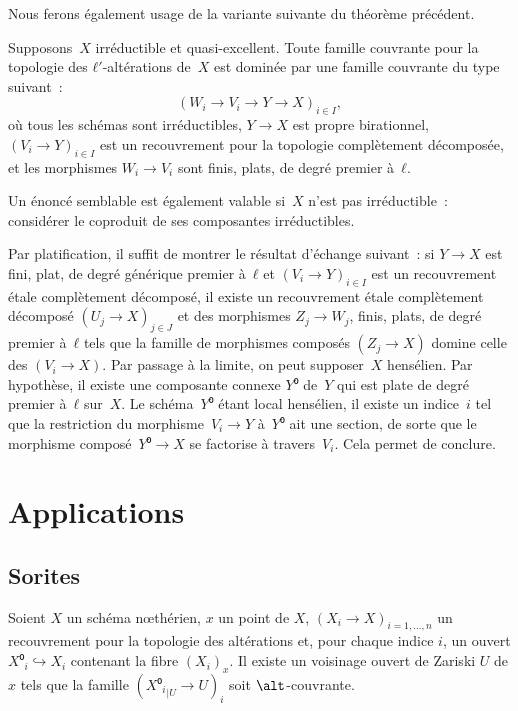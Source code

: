 \documentclass[10pt]{../fichiers-configuration-latex/smfart}
\begin{document}
Nous ferons également usage de la variante suivante
du théorème précédent.

\begin{théorème2}\label{2-forme standard pour annulation}
Supposons $X$ irréductible et quasi-excellent. Toute famille couvrante
pour la topologie des $ℓ'$-altérations de $X$
est dominée par une famille couvrante du type suivant :
\[
(W_i → V_i→ Y → X)_{i ∈ I},
\]
où tous les schémas sont irréductibles, $Y→X$ est propre birationnel,
$(V_i→Y)_{i ∈ I}$ est un recouvrement pour la topologie
complètement décomposée, et les morphismes
$W_i→V_i$ sont finis, plats, de degré premier à $ℓ$.
\end{théorème2}

Un énoncé semblable est également valable si $X$ n'est pas
irréductible : considérer le coproduit de ses composantes irréductibles.

\begin{démo}
Par platification, il suffit de montrer le résultat
d'échange suivant : si $Y → X$ est fini, plat, de degré
générique premier à $ℓ$ et $(V_i → Y)_{i ∈ I}$ est un
recouvrement étale complètement décomposé, il existe un
recouvrement étale complètement décomposé $(U_j → X)_{j ∈ J}$
et des morphismes $Z_j → W_j$, finis, plats, de degré
premier à $ℓ$ tels que la famille de morphismes
composés $(Z_j → X)$ domine celle des $(V_i → X)$.
Par passage à la limite, on peut supposer $X$ hensélien.
Par hypothèse, il existe une composante connexe $Y⁰$ de $Y$
qui est plate de degré premier à $ℓ$ sur $X$. Le schéma $Y⁰$ étant local hensélien,
il existe un indice $i$ tel que la restriction du
morphisme $V_i→Y$ à $Y⁰$ ait une section,
de sorte que le morphisme composé $Y⁰→X$ se factorise
à travers $V_i$. Cela permet de conclure.
\end{démo}

\section{Applications}


\subsection{Sorites}

\begin{proposition2}\label{2-voisinages fibre restent couvrants}
Soient $X$ un schéma nœthérien, $x$ un point de $X$,
$(X_i→X)_{i=1,\dots,n}$ un recouvrement pour la topologie des altérations
et, pour chaque indice $i$, un ouvert $X⁰_i↪X_i$ contenant la fibre
$(X_i)_x$. Il existe un voisinage ouvert de Zariski $U$ de $x$
tels que la famille $({X⁰_i}_{|U}→U)_i$ soit $\alt$-couvrante.
\end{proposition2}
\end{document}
